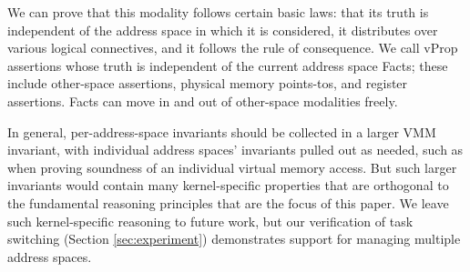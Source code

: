 We can prove that this modality follows certain basic laws: that its truth is independent of the address
space in which it is considered,  it distributes over various logical connectives, and it follows the rule of
consequence.
We call \textsf{vProp} assertions whose truth is independent of the current address space
\textsf{Fact}s; these include other-space assertions, physical memory points-tos, and register assertions.
\textsf{Fact}s can move in and out of other-space modalities freely.

In general, per-address-space invariants should be collected in a larger
VMM invariant, with individual address spaces' invariants pulled out as needed, such as when proving
soundness of an individual virtual memory access.
But such larger invariants would contain many kernel-specific properties that are orthogonal
to the fundamental reasoning principles that are the focus of this paper.
We leave such kernel-specific reasoning to future work, but our verification of task switching
(Section \ref{sec:experiment}) demonstrates support for managing multiple address spaces.



  



